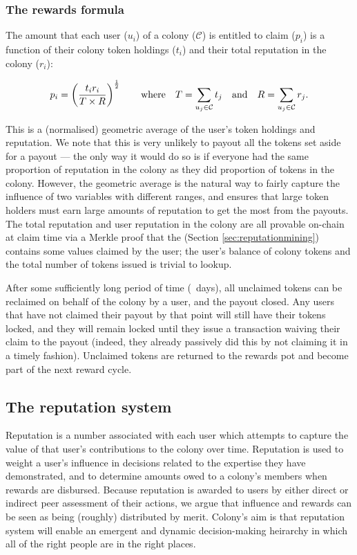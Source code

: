\subsubsection{The rewards formula}

The amount that each user ($u_i$) of a colony ($\mathcal{C}$) is entitled to claim ($p_i$) is a function of their colony token holdings ($t_i$) and their total reputation in the colony ($r_i$):

\begin{equation}\label{eq:reward-claim}
 p_i = \left(\frac{t_i r_i}{T \times R}\right)^{\frac{1}{2}} \qquad \textnormal{where} \quad T = \sum\limits_{u_j\in \mathcal{C}} t_j \quad\textnormal{and}\quad R = \sum\limits_{u_j\in \mathcal{C}} r_j.
\end{equation}

This is a (normalised) geometric average of the user's token holdings and reputation. We note that this is very unlikely to payout all the tokens set aside for a payout --- the only way it would do so is if everyone had the same proportion of reputation in the colony as they did proportion of tokens in the colony. However, the geometric average is the natural way to fairly capture the influence of two variables with different ranges, and ensures that large token holders must earn large amounts of reputation to get the most from the payouts. The total reputation and user reputation in the colony are all provable on-chain at claim time via a Merkle proof that the  (Section \ref{sec:reputationmining}) contains some values claimed by the user; the user's balance of colony tokens and the total number of tokens issued is trivial to lookup.

After some sufficiently long period of time (\rewardclaimduration\ days), all unclaimed tokens can be reclaimed on behalf of the colony by a user, and the payout closed. Any users that have not claimed their payout by that point will still have their tokens locked, and they will remain locked until they issue a transaction waiving their claim to the payout (indeed, they already passively did this by not claiming it in a timely fashion). Unclaimed tokens are returned to the rewards pot and become part of the next reward cycle.

\subsection{The reputation system}\label{sec:reputation}

Reputation is a number associated with each user which attempts to capture the value of that user's contributions to the colony over time. Reputation is used to weight a user's influence in decisions related to the expertise they have demonstrated, and to determine amounts owed to a colony's members when rewards are disbursed. Because reputation is awarded to users by either direct or indirect peer assessment of their actions, we argue that influence and rewards can be seen as being (roughly) distributed by merit. Colony's aim is that reputation system will enable an emergent and dynamic decision-making heirarchy in which all of the right people are in the right places.

